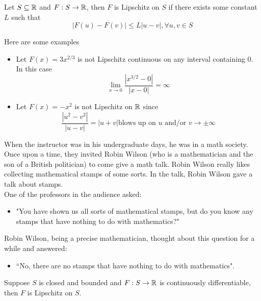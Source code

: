 \documentclass{article}
\begin{document}
\begin{definition}
    Let $S \subseteq \mathbb{R}$ and $F: S \to \mathbb{R}$, then $F$ is Lipschitz on $S$ if there exists some constant $L$ such that
    \[|F(u) - F(v)| \leq L |u - v|, \forall u, v \in S\]
\end{definition}

\begin{example}
    Here are some examples
    \begin{itemize}
        \item Let $F(x) = 3x^{2/3}$ is not Lipschitz continuous on any interval containing $0$. In this case
        \[\lim_{x \to 0} \frac{|x^{3/2} - 0|}{|x - 0|} = \infty\]
        \item Let $F(x) = -x^2$ is not Lipschitz on $\mathbb{R}$ since
        \[\frac{|u^2 - v^2|}{|u - v|} = |u + v| \text{blows up on $u$ and/or $v \to \pm \infty$} \]
    \end{itemize}
\end{example}

\begin{remark}
   When the instructor was in his undergraduate days, he was in a math society. Once upon a time, they invited Robin Wilson (who is a mathematician and the son of a British politician) to come give a math talk. Robin Wilson really likes collecting mathematical stamps of some sorts. In the talk, Robin Wilson gave a talk about stamps.\\

    One of the professors in the audience asked:
    \begin{itemize}
        \item "You have shown us all sorts of mathematical stamps, but do you know any stamps that have nothing to do with mathematics?"
    \end{itemize}
   Robin Wilson, being a precise mathematician, thought about this question for a while and answered:
   \begin{itemize}
       \item ``No, there are no stamps that have nothing to do with mathematics".
   \end{itemize}
\end{remark}

\begin{proposition}
    Suppose $S$ is closed and bounded and $F: S \to \mathbb{R}$ is continuously differentiable, then $F$ is Lipschitz on $S$.
\end{proposition}
\end{document}
